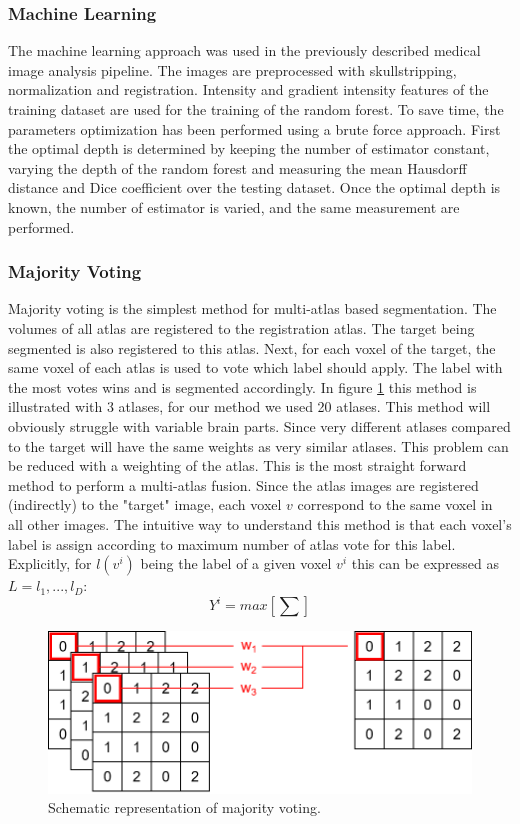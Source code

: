\subsubsection*{Machine Learning}
The machine learning approach was used in the previously described medical image analysis pipeline. The images are preprocessed with skullstripping, normalization and registration. Intensity and gradient intensity features of the training dataset are used for the training of the random forest. 
To save time, the parameters optimization has been performed using a brute force approach. First the optimal depth is determined by keeping the number of estimator constant, varying the depth of the random forest and measuring the mean Hausdorff distance and Dice coefficient over the testing dataset. Once the optimal depth is known, the number of estimator is varied, and the same measurement are performed.

\subsubsection*{Majority Voting}
Majority voting is the simplest method for multi-atlas based segmentation. The volumes of all atlas are registered to the registration atlas. The target being segmented is also registered to this atlas. Next, for each voxel of the target, the same voxel of each atlas is used to vote which label should apply. The label with the most votes wins and is segmented accordingly. In figure \ref{fig:majorityVoting} this method is illustrated with 3 atlases, for our method we used 20 atlases. This method will obviously struggle with variable brain parts. Since very different atlases compared to the target will have the same weights as very similar atlases. This problem can be reduced with a weighting of the atlas.
This is the most straight forward method to perform a multi-atlas fusion. Since the atlas images are registered (indirectly) to the "target" image, each voxel $v$ correspond to the same voxel in all other images. The intuitive way to understand this method is that each voxel's label is assign according to maximum number of atlas vote for this label. Explicitly, for $l(v^{i})$ being the label of a given voxel $v^{i}$ this can be expressed as $L={l_1, ... , l_D}$:
\[ Y^{i}=max[\sum{}] \]


\begin{figure}[h!]
	\centering
	\includegraphics[width=0.8\linewidth]{img/majorityVoting2}
	\caption{Schematic representation of majority voting.}
	\label{fig:majorityVoting}
\end{figure}

